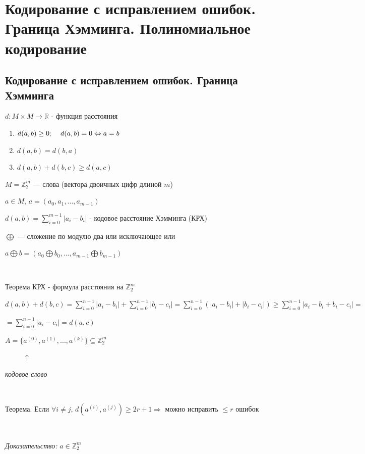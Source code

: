\documentclass[12pt]{article}
\begin{document}
\section{Кодирование с исправлением ошибок. Граница Хэмминга. Полиномиальное кодирование}
\subsection{Кодирование с исправлением ошибок. Граница Хэмминга}
$d:M\times M \rightarrow \mathbb{R}$ - функция расстояния
\begin{enumerate}
    \item $d(a,b) \geq 0; \hspace{4 mm} d(a,b) = 0 \Leftrightarrow a = b$
    \item $d(a,b) = d(b,a)$
    \item $d(a,b) + d(b,c) \geq d(a,c)$
\end{enumerate}\par
$M = \mathbb{Z}_2^m$ — слова (вектора двоичных цифр длиной $m$)\par
$a \in M, \,a = (a_0, a_1, ..., a_{m-1})$\par
$d(a,b) = \sum\limits_{i=0}^{m-1} |a_i - b_i|$ - кодовое расстояние Хэмминга (КРХ)\par
$\bigoplus$ — сложение по модулю два или исключающее или\par
$a \bigoplus b = (a_0 \bigoplus b_0, ... , a_{m-1} \bigoplus b_{m-1})$\par
$ $\par
Теорема КРХ - формула расстояния на $\mathbb{Z}_2^m$\par
$d(a,b)+d(b,c) = \sum\limits_{i=0}^{n-1}|a_i - b_i|+\sum\limits_{i=0}^{n-1}|b_i - c_i|=\sum\limits_{i=0}^{n-1}(|a_i - b_i|+|b_i - c_i|) \geq \sum\limits_{i=0}^{n-1}|a_i - b_i + b_i - c_i| =$\par
$ =\sum\limits_{i=0}^{n-1}|a_i - c_i| = d(a,c)$\par
$A=\{a^{(0)}, a^{(1)}, ... , a^{(k)}\} \subseteq \mathbb{Z}_2^m$\par
$\hspace{1 cm} \uparrow$\par
\textit{кодовое слово}\par
$ $\par
Теорема. Если $\forall i \neq j$, $d(a^{(i)},a^{(j)}) \geq 2r+1 \Rightarrow$ можно исправить $\leq r$ ошибок \par
$ $\par
\textit{Доказательство:} $a \in \mathbb{Z}_2^m$\par
\end{document}
